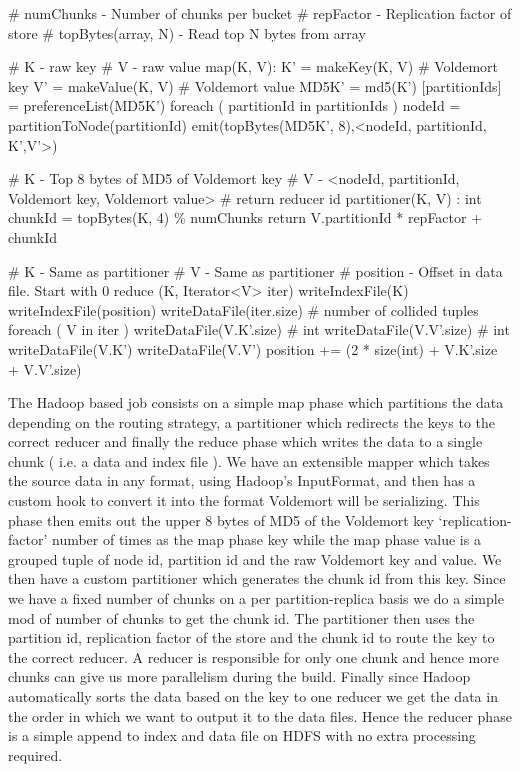 \documentclass[10pt,twocolumn,preprint,natbib,authoryear]{sigplanconf}
\begin{document}
\scriptsize
\label{MapReduce for Chunk generation}
\begin{verbatimtab}
# numChunks - Number of chunks per bucket
# repFactor - Replication factor of store
# topBytes(array, N) - Read top N bytes from array

# K - raw key
# V - raw value
map(K, V):
  K' = makeKey(K, V)     # Voldemort key
  V' = makeValue(K, V)   # Voldemort value
  MD5K' = md5(K')
  [partitionIds] = preferenceList(MD5K')
  foreach ( partitionId in partitionIds )
    nodeId = partitionToNode(partitionId)
    emit(topBytes(MD5K', 8),<nodeId, partitionId, K',V'>)      

# K - Top 8 bytes of MD5 of Voldemort key
# V - <nodeId, partitionId, Voldemort key, Voldemort value>
# return reducer id
partitioner(K, V) : int
  chunkId = topBytes(K, 4) \% numChunks
  return V.partitionId * repFactor + chunkId
 
# K - Same as partitioner
# V - Same as partitioner
# position - Offset in data file. Start with 0
reduce (K, Iterator<V> iter)
  writeIndexFile(K)
  writeIndexFile(position)
  writeDataFile(iter.size)   # number of collided tuples
  foreach ( V in iter )
    writeDataFile(V.K'.size) # int
    writeDataFile(V.V'.size) # int
    writeDataFile(V.K')
    writeDataFile(V.V')
    position += (2 * size(int) + V.K'.size + V.V'.size)
\end{verbatimtab}
\normalsize


The Hadoop based job consists on a simple map phase which partitions the data depending on the routing strategy, a partitioner which redirects the keys to the correct reducer and finally the reduce phase which writes the data to a single chunk ( i.e. a data and index file ). We have an extensible mapper which takes the source data in any format, using Hadoop's InputFormat, and then has a custom hook to convert it into the format Voldemort will be serializing. This phase then emits out the upper 8 bytes of MD5 of the Voldemort key `replication-factor' number of times as the map phase key while the map phase value is a grouped tuple of node id, partition id and the raw Voldemort key and value. We then have a custom partitioner which generates the chunk id from this key. Since we have a fixed number of chunks on a per partition-replica basis we do a simple mod of number of chunks to get the chunk id. The partitioner then uses the partition id, replication factor of the store and the chunk id to route the key to the correct reducer. A reducer is responsible for only one chunk and hence more chunks can give us more parallelism during the build. Finally since Hadoop automatically sorts the data based on the key to one reducer we get the data in the order in which we want to output it to the data files. Hence the reducer phase is a simple append to index and data file on HDFS with no extra processing required.  
\end{document}
